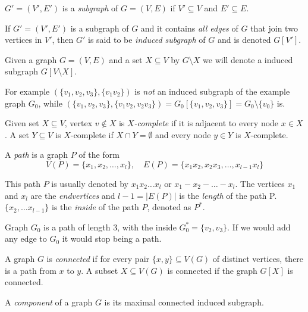 \begin{defn}[subgraph]
  $G' = (V', E')$ is a \emph{subgraph} of $G = (V, E)$ if $V' \subseteq V$ and $E' \subseteq E$.
\end{defn}

\begin{defn}
  If $G' = (V', E')$ is a subgraph of $G$ and it contains \emph{all edges} of $G$ that join two vertices in $V'$, then $G'$ is said to be \emph{induced subgraph} of $G$ and is denoted $G[V']$.
\end{defn}

Given a graph $G = (V, E)$ and a set $X \subseteq V$ by $G\setminus X$ we will denote a induced subgraph $G[V\setminus X]$.

For example $(\{v_1, v_2, v_3\}, \{v_1v_2\})$ is \emph{not} an induced subgraph of the example graph $G_0$, while $(\{v_1, v_2, v_3\}, \{v_1v_2, v_2v_3\}) = G_0[\{v_1, v_2, v_3\}] = G_0 \setminus \{v_0\}$ is.

\begin{defn}[$X$-completeness]
  Given set $X \subseteq V$, vertex $v \notin X$ is \emph{$X$-complete} if it is adjacent to every node $x \in X$. A set $Y \subseteq V$ is $X$-complete if $X \cap Y = \emptyset$ and every node $y \in Y$ is $X$-complete.
\end{defn}

\begin{defn}[path]
  A \emph{path} is a graph $P$ of the form
  \[ V(P) = \{x_1, x_2, \ldots, x_l\},\quad E(P) = \{x_1x_2, x_2x_3, \ldots, x_{l-1}x_l\} \]
\end{defn}
This path $P$ is usually denoted by $x_1x_2\ldots x_l$ or $x_1 - x_2 - \ldots - x_l$. The vertices $x_1$ and $x_l$ are the \emph{endvertices} and ${l-1} = |E(P)|$ is the \emph{length} of the path P. $\{x_2, \ldots x_{l-1}\}$ is the \emph{inside} of the path $P$, denoted as $P^*$.

Graph $G_0$ is a path of length 3, with the inside $G_0^* = \{v_2, v_3\}$. If we would add any edge to $G_0$ it would stop being a path.


\begin{defn}
  A graph $G$ is \emph{connected} if for every pair $\{x, y\} \subseteq V(G)$ of distinct vertices, there is a path from $x$ to $y$.
  A subset $X \subseteq V(G)$ is connected if the graph $G[X]$ is connected.
\end{defn}

\begin{defn}[component]
  A \emph{component} of a graph $G$ is its maximal connected induced subgraph.
\end{defn}


